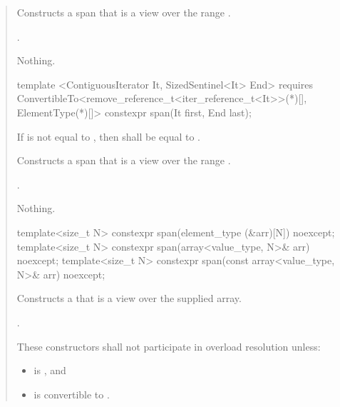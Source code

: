 \documentclass{wg21}
\begin{document}
\begin{quote}
\begin{removedblock}
\begin{itemdescr}
	\pnum
	\effects
	Constructs a span that is a view over the range .
	
	\pnum
	\ensures
	.
	
	\pnum
	\throws
	Nothing.
\end{itemdescr}
\end{removedblock}

\begin{addedblock}
\begin{itemdecl}
template <ContiguousIterator It, SizedSentinel<It> End>
requires ConvertibleTo<remove_reference_t<iter_reference_t<It>>(*)[], ElementType(*)[]>
constexpr span(It first, End last);
\end{itemdecl}
\end{addedblock}

\begin{addedblock}

\begin{itemdescr}

	\pnum
	\expects
	If  is not equal to ,
	then  shall be equal to .
	
	\pnum
	\effects
	Constructs a span that is a view over the range .
	
	\pnum
	\ensures
	.
	
	\pnum
	\throws
	Nothing.

\end{itemdescr}
\end{addedblock}

\begin{itemdecl}
template<size_t N> constexpr span(element_type (&arr)[N]) noexcept;
template<size_t N> constexpr span(array<value_type, N>& arr) noexcept;
template<size_t N> constexpr span(const array<value_type, N>& arr) noexcept;
\end{itemdecl}
\begin{itemdescr}
	\pnum
	\effects
	Constructs a  that is a view over the supplied array.
	
	\pnum
	\ensures
	.
	
	\pnum
	\remarks
	These constructors shall not participate in overload resolution unless:
	\begin{itemize}
		\item {} is , and
		\item {} is convertible to .
	\end{itemize}
\end{itemdescr}


\end{quote}
\end{document}
